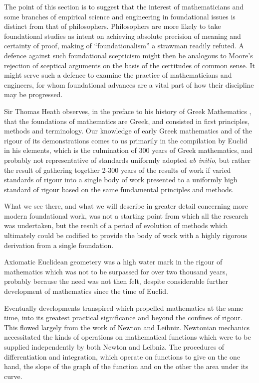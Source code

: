 \documentclass[10pt,titlepage]{book}
\begin{document}
The point of this section is to suggest that the interest of mathematicians and some branches of empirical science and engineering in foundational issues is distinct from that of philosophers.
Philosophers are more likely to take foundational studies as intent on achieving absolute precision of meaning and certainty of proof, making of ``foundationalism'' a strawman readily refuted.
A defence against such foundational scepticism might then be analogous to Moore's rejection of sceptical arguments on the basis of the certitudes of common sense.
It might serve such a defence to examine the practice of mathematicians and engineers, for whom foundational advances are a vital part of how their discipline may be progressed.

Sir Thomas Heath observes, in the preface to his history of Greek Mathematics \cite{heath1921}, that the foundations of mathematics are Greek, and consisted in first principles, methods and terminology.
Our knowledge of early Greek mathematics and of the rigour of its demonstrations comes to us primarily in the compilation by Euclid in his elements, which is the culmination of 300 years of Greek mathematics, and probably not representative of standards uniformly adopted \emph{ab initio}, but rather the result of gathering together 2-300 years of the results of work if varied standards of rigour into a single body of work presented to a uniformly high standard of rigour based on the same fundamental principles and methods.

What we see there, and what we will describe in greater detail concerning more modern foundational work, was not a starting point from which all the research was undertaken, but the result of a period of evolution of methods which ultimately could be codified to provide the body of work with a highly rigorous derivation from a single  foundation.

Axiomatic Euclidean geometery was a high water mark in the rigour of mathematics which was not to be surpassed for over two thousand years, probably because the need was not then felt, despite considerable further development of mathematics since the time of Euclid.

Eventually developments transpired which propelled mathematics at the same time, into its greatest practical significance and beyond the confines of rigour.
This flowed largely from the work of Newton and Leibniz.
Newtonian mechanics necessitated the kinds of operations on mathematical functions which were to be supplied independently by both Newton and Leibniz.
The procedures of differentiation and integration, which operate on functions to give on the one hand, the slope of the graph of the function and on the other the area under its curve.
\end{document}

